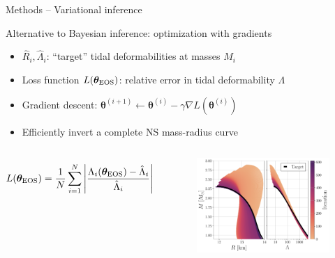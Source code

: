 \documentclass[usenames,dvipsnames,t]{beamer}
\newcommand{\thetaeos}{\boldsymbol{\theta}_{\rm{EOS}}}
\newcommand{\boldtheta}{\boldsymbol{\theta}}
\begin{document}
\begin{frame}{Methods -- Variational inference}

  \def\x{2mm}

  Alternative to Bayesian inference: optimization with gradients


  \begin{itemize}
    \vspace{\x}

    \item $\hat{R}_i, \hat{\Lambda}_i$: ``target'' tidal deformabilities at masses $M_i$

    \vspace{\x}
    
    \item Loss function $L(\thetaeos)$: relative error in tidal deformability $\Lambda$
    
    \vspace{\x}

    \item Gradient descent: $\boldtheta^{(i+1)} \leftarrow \boldtheta^{(i)} - \gamma \nabla L(\boldtheta^{(i)})$

    \vspace{\x}

    \item Efficiently invert a complete NS mass-radius curve
  \end{itemize}

  \vspace{-3mm}

  \begin{columns}


    \begin{equation*}
      L(\thetaeos) = \frac1N \sum_{i=1}^N \left| \frac{\Lambda_i(\thetaeos) - \hat{\Lambda}_i}{\hat{\Lambda}_i} \right|
    \end{equation*}


    \begin{figure}[htpb]
      \centering
      \includegraphics[width=1.0\linewidth]{Figures/showcase_variational_inference.pdf}
    \end{figure}


\end{columns}
\end{frame}
\end{document}
